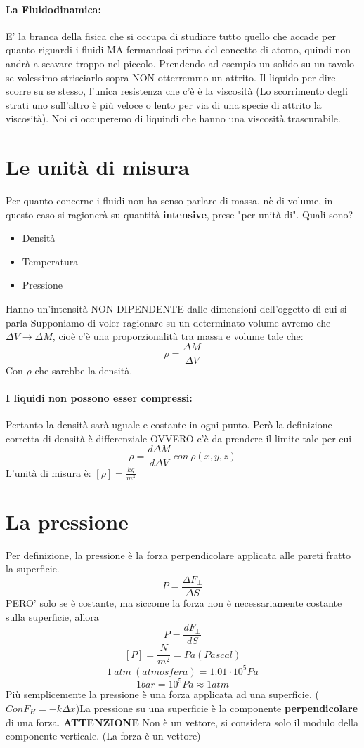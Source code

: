 \documentclass[12pt, a4paper, openany, oneside]{book}
\begin{document}
\paragraph{La Fluidodinamica: }
E' la branca della fisica che si occupa di studiare tutto quello che accade per
quanto riguardi i fluidi MA fermandosi prima del concetto di atomo, quindi non 
andrà a scavare troppo nel piccolo. Prendendo ad esempio un solido su un tavolo
se volessimo strisciarlo sopra NON otterremmo un attrito. Il liquido per dire
scorre su se stesso, l'unica resistenza che c'è è la viscosità (Lo scorrimento
degli strati uno sull'altro è più veloce o lento per via di una specie di attrito
la viscosità). Noi ci occuperemo di liquindi che hanno una viscosità trascurabile.
\section{Le unità di misura}
Per quanto concerne i fluidi non ha senso parlare di massa, nè di volume, in 
questo caso si ragionerà su quantità \textbf{intensive}, prese "per unità di".
Quali sono? 
\begin{itemize}
	\item Densità
	\item Temperatura
	\item Pressione
\end{itemize}
Hanno un'intensità NON DIPENDENTE dalle dimensioni dell'oggetto di cui si parla
Supponiamo di voler ragionare su un determinato volume avremo che $\Delta V \to 
\Delta M$, cioè c'è una proporzionalità tra massa e volume tale che: 
\[
	\rho = \frac{\Delta M}{\Delta V}
\]
Con $\rho$ che sarebbe la densità.
\paragraph{I liquidi non possono esser compressi: }Pertanto la densità sarà 
uguale e costante in ogni punto. Però la definizione corretta di densità è 
differenziale OVVERO c'è da prendere il limite tale per cui 
\[
    	\rho = \frac{d \Delta M}{d \Delta V} ~ con ~ \rho(x, y, z)
\]    
L'unità di misura è: $[\rho] = \frac{kg}{m^{3}}$
\section{La pressione}
Per definizione, la pressione è la forza perpendicolare applicata alle pareti 
fratto la superficie. 
\[
	P = \frac{\Delta F_{\perp}}{\Delta S}
\]
PERO' solo se è costante, ma siccome la forza non è necessariamente costante
sulla superficie, allora
\[
	P = \frac{dF_{\perp}}{dS}
\]
\[
	[P] = \frac{N}{m^{2}} = Pa (Pascal)	
\]	
\[
	1 ~ atm ~ (atmosfera) = 1.01 \cdot 10^{5} Pa
\]
\[
	1 bar = 10^{5} Pa \approx 1 atm
\]
Più semplicemente la pressione è una forza applicata ad una superficie. ($
Con F_{H} = -k\Delta x $)La pressione su una superficie è la componente \textbf{
	perpendicolare
} di una forza. \textbf{ATTENZIONE} Non è un vettore, si considera solo il 
modulo della componente verticale. (La forza è un vettore)
\end{document}
